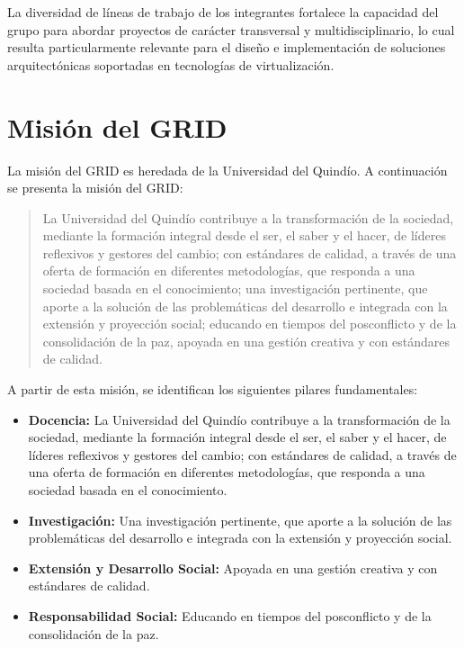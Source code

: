 La diversidad de líneas de trabajo de los integrantes fortalece la capacidad del grupo para abordar proyectos de carácter transversal y multidisciplinario, lo cual resulta particularmente relevante para el diseño e implementación de soluciones arquitectónicas soportadas en tecnologías de virtualización.

\section{Misión del GRID}

La misión del GRID es heredada de la Universidad del Quindío. A continuación se presenta la misión del GRID:\@

\begin{quote}
La Universidad del Quindío contribuye a la transformación de la sociedad, mediante la formación integral desde el ser, el saber y el hacer, de líderes reflexivos y gestores del cambio; con estándares de calidad, a través de una oferta de formación en diferentes metodologías, que responda a una sociedad basada en el conocimiento; una investigación pertinente, que aporte a la solución de las problemáticas del desarrollo e integrada con la extensión y proyección social; educando en tiempos del posconflicto y de la consolidación de la paz, apoyada en una gestión creativa y con estándares de calidad.
\end{quote}

A partir de esta misión, se identifican los siguientes pilares fundamentales:

\begin{itemize}
    \item \textbf{Docencia:} La Universidad del Quindío contribuye a la transformación de la sociedad, mediante la formación integral desde el ser, el saber y el hacer, de líderes reflexivos y gestores del cambio; con estándares de calidad, a través de una oferta de formación en diferentes metodologías, que responda a una sociedad basada en el conocimiento.

    \item \textbf{Investigación:} Una investigación pertinente, que aporte a la solución de las problemáticas del desarrollo e integrada con la extensión y proyección social.

    \item \textbf{Extensión y Desarrollo Social:} Apoyada en una gestión creativa y con estándares de calidad.

    \item \textbf{Responsabilidad Social:} Educando en tiempos del posconflicto y de la consolidación de la paz.
\end{itemize}

